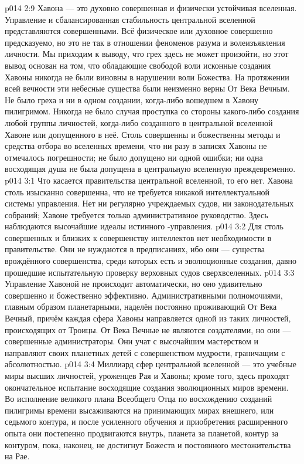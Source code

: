 \vs p014 2:9 \pc Хавона --- это духовно совершенная и физически устойчивая вселенная. Управление и сбалансированная стабильность центральной вселенной представляются совершенными. Всё физическое или духовное совершенно предсказуемо, но это не так в отношении феноменов разума и волеизъявления личности. Мы приходим к выводу, что грех здесь не может произойти, но этот вывод основан на том, что обладающие свободой воли исконные создания Хавоны никогда не были виновны в нарушении воли Божества. На протяжении всей вечности эти небесные существа были неизменно верны От Века Вечным. Не было греха и ни в одном создании, когда\hyp{}либо вошедшем в Хавону пилигримом. Никогда не было случая проступка со стороны какого\hyp{}либо создания любой группы личностей, когда\hyp{}либо созданного в центральной вселенной Хавоне или допущенного в неё. Столь совершенны и божественны методы и средства отбора во вселенных времени, что ни разу в записях Хавоны не отмечалось погрешности; не было допущено ни одной ошибки; ни одна восходящая душа не была допущена в центральную вселенную преждевременно.
\vs p014 3:1 Что касается правительства центральной вселенной, то его нет. Хавона столь изысканно совершенна, что не требуется никакой интеллектуальной системы управления. Нет ни регулярно учреждаемых судов, ни законодательных собраний; Хавоне требуется только административное руководство. Здесь наблюдаются высочайшие идеалы истинного \hyp{}управления.
\vs p014 3:2 Для столь совершенных и близких к совершенству интеллектов нет необходимости в правительстве. Они не нуждаются в предписаниях, ибо они --- существа врождённого совершенства, среди которых есть и эволюционные создания, давно прошедшие испытательную проверку верховных судов сверхвселенных.
\vs p014 3:3 Управление Хавоной не происходит автоматически, но оно удивительно совершенно и божественно эффективно. Административными полномочиями, главным образом планетарными, наделён постоянно проживающий От Века Вечный, причём каждая сфера Хавоны направляется одной из таких личностей, происходящих от Троицы. От Века Вечные не являются создателями, но они --- совершенные администраторы. Они учат с высочайшим мастерством и направляют своих планетных детей с совершенством мудрости, граничащим с абсолютностью.
\vs p014 3:4 Миллиард сфер центральной вселенной --- это учебные миры высших личностей, уроженцев Рая и Хавоны; кроме того, здесь проходят окончательное испытание восходящие создания эволюционных миров времени. Во исполнение великого плана Всеобщего Отца по восхождению созданий пилигримы времени высаживаются на принимающих мирах внешнего, или седьмого контура, и после усиленного обучения и приобретения расширенного опыта они постепенно продвигаются внутрь, планета за планетой, контур за контуром, пока, наконец, не достигнут Божеств и постоянного местожительства на Рае.
